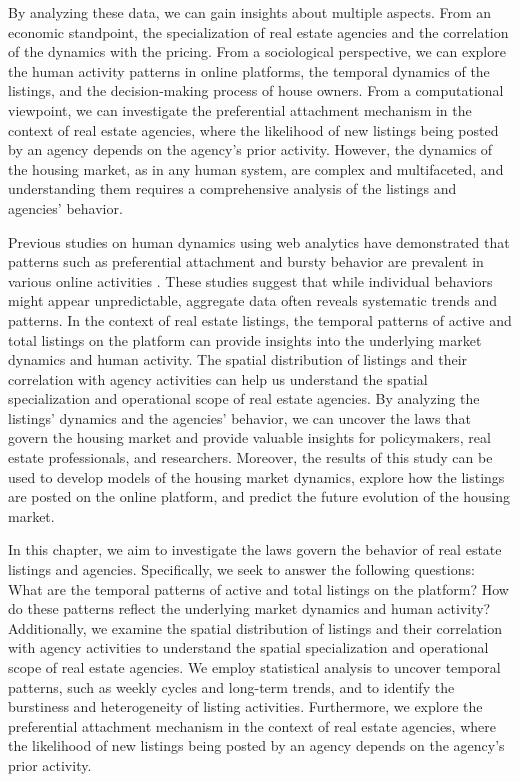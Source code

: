 By analyzing these data, we can gain insights about multiple aspects. From an economic standpoint, the specialization of real estate agencies and the correlation of the dynamics with the pricing. From a sociological perspective, we can explore the human activity patterns in online platforms, the temporal dynamics of the listings, and the decision-making process of house owners. From a computational viewpoint, we can investigate the preferential attachment mechanism in the context of real estate agencies, where the likelihood of new listings being posted by an agency depends on the agency's prior activity. However, the dynamics of the housing market, as in any human system, are complex and multifaceted, and understanding them requires a comprehensive analysis of the listings and agencies' behavior.

Previous studies on human dynamics using web analytics have demonstrated that patterns such as preferential attachment and bursty behavior are prevalent in various online activities \cite{szell2010multirelational}. These studies suggest that while individual behaviors might appear unpredictable, aggregate data often reveals systematic trends and patterns. In the context of real estate listings, the temporal patterns of active and total listings on the platform can provide insights into the underlying market dynamics and human activity. The spatial distribution of listings and their correlation with agency activities can help us understand the spatial specialization and operational scope of real estate agencies. By analyzing the listings' dynamics and the agencies' behavior, we can uncover the laws that govern the housing market and provide valuable insights for policymakers, real estate professionals, and researchers. Moreover, the results of this study can be used to develop models of the housing market dynamics, explore how the listings are posted on the online platform, and predict the future evolution of the housing market.

In this chapter, we aim to investigate the laws govern the behavior of real estate listings and agencies. Specifically, we seek to answer the following questions: What are the temporal patterns of active and total listings on the platform? How do these patterns reflect the underlying market dynamics and human activity? Additionally, we examine the spatial distribution of listings and their correlation with agency activities to understand the spatial specialization and operational scope of real estate agencies. We employ statistical analysis to uncover temporal patterns, such as weekly cycles and long-term trends, and to identify the burstiness and heterogeneity of listing activities. Furthermore, we explore the preferential attachment mechanism in the context of real estate agencies, where the likelihood of new listings being posted by an agency depends on the agency's prior activity.


